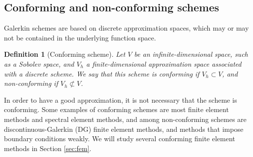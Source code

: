 \documentclass{article}
\renewcommand{\vec}{\vectorsym}
\DeclareMathOperator{\dive}{\text{div}}
\DeclareMathOperator{\curl}{\text{curl}}
\newtheorem{definition}{Definition}
\newtheorem{lemma}{Lemma}
\begin{document}
\subsection{Conforming and non-conforming schemes} 
Galerkin schemes are based on discrete approximation spaces, which may or may not be contained in the underlying function space.
\begin{definition}[Conforming scheme]
    Let $V$ be an infinite-dimensional space, such as a Sobolev space, and $V_h$ a finite-dimensional approximation space associated with a discrete scheme. We say that this scheme is \textit{conforming} if $V_h\subset V$, and \textit{non-conforming} if $V_h\not\subset V$. 
\end{definition}

In order to have a good approximation, it is not necessary that the scheme is conforming. Some examples of conforming schemes are most finite element methods and spectral element methods, and among non-conforming schemes are discontinuous-Galerkin (DG) finite element methods, and methods that impose boundary conditions weakly. We will study several conforming finite element methods in Section \ref{sec:fem}. 
\end{document}
